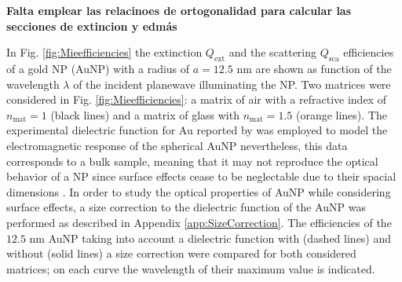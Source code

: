 
\textbf{Falta emplear las relacinoes de ortogonalidad para calcular las secciones de extincion y edmás}
\clearpage


In Fig. \ref{fig:Mieefficiencies} the extinction  $Q_\text{ext}$ and the scattering  $Q_\text{sca}$ efficiencies of a gold NP (AuNP) with a radius of $a = 12.5$ nm are shown as function of the wavelength $\lambda$ of the incident planewave illuminating the NP. Two matrices were considered in Fig. \ref{fig:Mieefficiencies}: a matrix of air with a refractive index of $n_\text{mat} = 1$ (black lines) and a matrix of glass with $n_\text{mat} = 1.5$ (orange lines).  The experimental dielectric function for Au reported by \citeauthor{johnson_optical_1972} \cite{johnson_optical_1972}  was employed to model the electromagnetic response of the spherical AuNP nevertheless, this data corresponds to a bulk sample, meaning that it may not reproduce the optical behavior of a NP since surface effects cease to be neglectable  due to their spacial dimensions \cite{noguez_surface_2007}.   In order to study  the optical properties of AuNP while considering  surface effects,  a size correction to the dielectric function of the AuNP was performed as described in Appendix \ref{app:SizeCorrection}. The efficiencies of the $12.5$ nm AuNP  taking into account a dielectric function with (dashed lines) and without (solid lines) a size correction were compared for both considered matrices; on each curve the wavelength of their maximum value is indicated.

